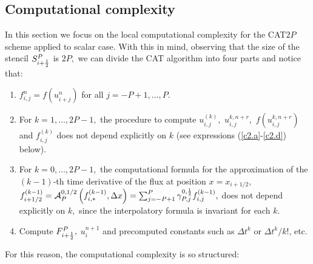 \subsection{Computational complexity}
\label{sec:comp_compl}
In this section we focus on the local computational complexity for the CAT$2P$ scheme applied to scalar case. With this in mind, observing that the size of the stencil $S_{i+\frac{1}{2}}^P$ is $2P,$ we can divide the CAT algorithm into four parts and notice that:
\begin{enumerate}
    \item $f_{i,j}^n = f(u_{i+j}^n)$ for all $j=-P+1,\ldots,P.$
    
    \item For $k=1,\ldots,2P-1,$ the procedure to compute $u_{i,j}^{(k)},$ $u_{i,j}^{k,n+r},$ $f(u_{i,j}^{k,n+r})$ and $f_{i,j}^{(k)}$ does not depend explicitly on $k$ (see expressions (\ref{c2.a}-\ref{c2.d}) below). 
    
    \item For $k=0,\ldots,2P-1,$ the computational formula for the approximation of the $(k-1)$-th time derivative of the flux at position $x = x_{i+1/2},$   $f_{i+1/2}^{(k-1)} =  \mathcal{A}^{0,1/2}_{P}\left(f_{i,*}^{(k-1)},\Delta x\right) = \sum_{j=-P+1}^P \gamma^{0,\frac{1}{2}}_{P,j}f_{i,j}^{(k-1)},$ does not depend explicitly on $k,$ since the interpolatory formula is invariant for each $k.$ 
    
    \item Compute  $F^P_{i+\frac{1}{2}},$ $u_i^{n+1}$ and precomputed constants such as $\Delta t^k$ or $\Delta t^k/k!$, etc.
\end{enumerate} 
For this reason, the computational complexity is so structured:
